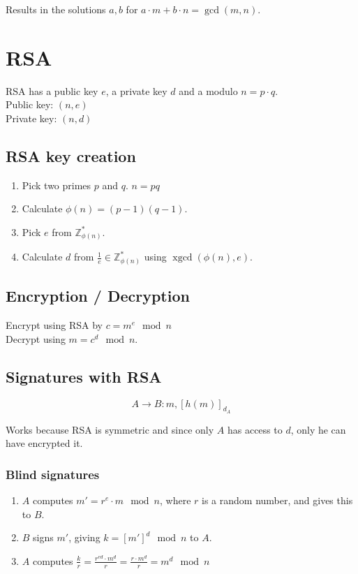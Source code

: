 \documentclass{article}
\newcommand{\ZZ}{\mathbb{Z}}
\newcommand{\Z}{\ZZ}
\newcommand{\egcd}{\operatorname{xgcd}}
\begin{document}
Results in the solutions $a,b$ for $a \cdot m + b \cdot n = \gcd(m,n)$.

\section{RSA}

RSA has a public key $e$, a private key $d$ and a modulo $n=p\cdot q$. \\
Public key: $(n, e)$\\
Private key: $(n,d)$ \\

\subsection{RSA key creation}
\begin{enumerate}
  \item Pick two primes $p$ and $q$. $n=pq$
  \item Calculate $\phi(n) = (p-1)(q-1)$.
  \item Pick $e$ from $\Z^*_{\phi(n)}$.
  \item Calculate $d$ from $\frac{1}{e} \in \Z^*_{\phi(n)}$ using $\egcd(\phi(n),e)$.
\end{enumerate}

\subsection{Encryption / Decryption}
Encrypt using RSA by $c = m^e \mod n$\\
Decrypt using $m = c^d \mod n$.

\subsection{Signatures with RSA}

\[
  A \longrightarrow B : m, [h(m)]_{d_A}
\]

Works because RSA is symmetric and since only $A$ has access to $d$, only he
can have encrypted it.

\subsubsection{Blind signatures}

\begin{enumerate}
  \item $A$ computes $m' = r^e \cdot m \mod n$, where $r$ is a random number, and gives
    this to $B$.
  \item $B$ signs $m'$, giving $k = [m']^d \mod n$ to $A$.
  \item $A$ computes $\frac{k}{r} = \frac{r^{ed} \cdot m^d}{r} = \frac{r \cdot m^d}{r} = m^d \mod n$
\end{enumerate}
\end{document}

